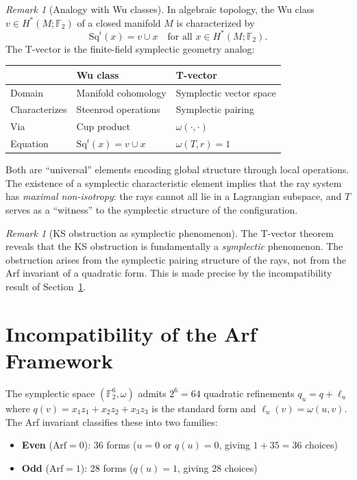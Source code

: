 \documentclass[11pt,a4paper]{article}
\theoremstyle{remark}
\newtheorem{remark}[theorem]{Remark}
\newcommand{\F}{\mathbb{F}}
\begin{document}
\begin{remark}[Analogy with Wu classes]
\label{rem:wu}
In algebraic topology, the Wu class $v \in H^*(M; \F_2)$ of a closed
manifold $M$ is characterized by
\[
  \text{Sq}^i(x) = v \cup x \quad \text{for all } x \in H^*(M; \F_2).
\]
The T-vector is the finite-field symplectic geometry analog:

\medskip

\begin{center}
\begin{tabular}{l l l}
\toprule
& \textbf{Wu class} & \textbf{T-vector} \\
\midrule
Domain & Manifold cohomology & Symplectic vector space \\
Characterizes & Steenrod operations & Symplectic pairing \\
Via & Cup product & $\omega(\cdot, \cdot)$ \\
Equation & $\text{Sq}^i(x) = v \cup x$ & $\omega(T, r) = 1$ \\
\bottomrule
\end{tabular}
\end{center}

\medskip

Both are ``universal'' elements encoding global structure through local
operations. The existence of a symplectic characteristic element
implies that the ray system has \emph{maximal non-isotropy}: the rays
cannot all lie in a Lagrangian subspace, and $T$ serves as a
``witness'' to the symplectic structure of the configuration.
\end{remark}

\begin{remark}[KS obstruction as symplectic phenomenon]
\label{rem:symplectic-ks}
The T-vector theorem reveals that the KS obstruction is fundamentally a
\emph{symplectic} phenomenon. The obstruction arises from the symplectic
pairing structure of the rays, not from the Arf invariant of a
quadratic form. This is made precise by the incompatibility result of
Section~\ref{sec:arf-fails}.
\end{remark}

\section{Incompatibility of the Arf Framework}
\label{sec:arf-fails}

The symplectic space $(\F_2^6, \omega)$ admits $2^6 = 64$ quadratic
refinements $q_u = q + \ell_u$ where $q(v) = x_1 z_1 + x_2 z_2 + x_3
z_3$ is the standard form and $\ell_u(v) = \omega(u, v)$. The Arf
invariant classifies these into two families:
\begin{itemize}
  \item \textbf{Even} ($\text{Arf} = 0$): 36 forms
    ($u = 0$ or $q(u) = 0$, giving $1 + 35 = 36$ choices)
  \item \textbf{Odd} ($\text{Arf} = 1$): 28 forms
    ($q(u) = 1$, giving 28 choices)
\end{itemize}
\end{document}
